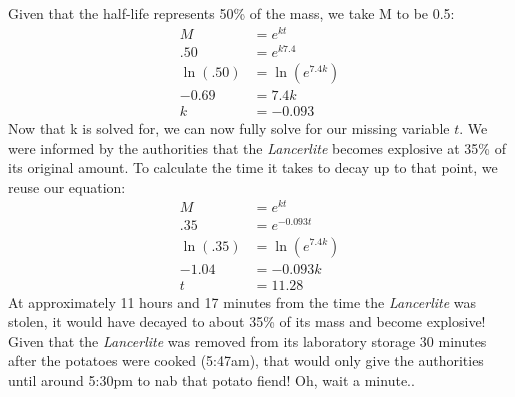 \documentclass{article}
\begin{document}
Given that the half-life represents 50\% of the mass, we take M to be 0.5:
\begin{align}
    M &= e^{kt}\\[1em]
    .50 &= e^{k7.4}\\[1em]
    \ln(.50) &= \ln(e^{7.4k})\\[1em]
    -0.69 &= 7.4k \\[1em]
    k &= -0.093
\end{align}
Now that k is solved for, we can now fully solve for our missing variable $t$. We were informed by the authorities that the \textit{Lancerlite} becomes explosive at 35\% of its original amount. To calculate the time it takes to decay up to that point, we reuse our equation:
\begin{align}
    M &= e^{kt}\\[1em]
    .35 &= e^{-0.093t}\\[1em]
    \ln(.35) &= \ln(e^{7.4k})\\[1em]
    -1.04 &= -0.093k \\[1em]
    t &= 11.28
\end{align}
At approximately 11 hours and 17 minutes from the time the \textit{Lancerlite} was stolen, it would have decayed to about 35\% of its mass and become explosive! Given that the \textit{Lancerlite} was removed from its laboratory storage 30 minutes after the potatoes were cooked (5:47am), that would only give the authorities until around 5:30pm to nab that potato fiend! Oh, wait a minute..
\end{document}
